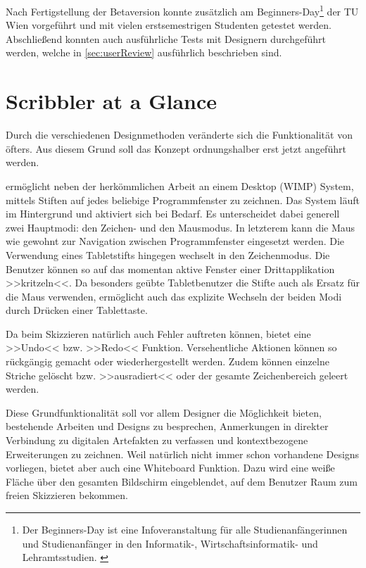 \medskip Nach Fertigstellung der Betaversion konnte \scribbler zusätzlich am Beginners-Day\footnote{Der Beginners-Day ist eine Infoveranstaltung für alle Studienanfängerinnen und Studienanfänger in den Informatik-, Wirtschaftsinformatik- und Lehramtsstudien. \citep{TU:2010}} der TU Wien vorgeführt und mit vielen erstsemestrigen Studenten getestet werden. Abschließend konnten auch ausführliche Tests mit Designern durchgeführt werden, welche in \autoref{sec:userReview} ausführlich beschrieben sind.

\section{Scribbler at a Glance} 
Durch die verschiedenen Designmethoden veränderte sich die Funktionalität von \scribbler öfters. Aus diesem Grund soll das Konzept ordnungshalber erst jetzt angeführt werden.

\medskip \scribbler ermöglicht neben der herkömmlichen Arbeit an einem Desktop (\acs{WIMP}) System, mittels Stiften auf jedes beliebige Programmfenster zu zeichnen. Das System läuft im Hintergrund und aktiviert sich bei Bedarf. Es unterscheidet dabei generell zwei Hauptmodi: den Zeichen- und den Mausmodus. In letzterem kann die Maus wie gewohnt zur Navigation zwischen Programmfenster eingesetzt werden. Die Verwendung eines Tabletstifts hingegen wechselt in den Zeichenmodus. Die Benutzer können so auf das momentan aktive Fenster einer Drittapplikation >>kritzeln<<. Da besonders geübte Tabletbenutzer die Stifte auch als Ersatz für die Maus verwenden, ermöglicht \scribbler auch das explizite Wechseln der beiden Modi durch Drücken einer Tablettaste.

\medskip Da beim Skizzieren natürlich auch Fehler auftreten können, bietet \scribbler eine >>Undo<< bzw. >>Redo<< Funktion. Versehentliche Aktionen können so rückgängig gemacht oder wiederhergestellt werden. Zudem können einzelne Striche gelöscht bzw. >>ausradiert<< oder der gesamte Zeichenbereich geleert werden.

\medskip Diese Grundfunktionalität soll vor allem Designer die Möglichkeit bieten, bestehende Arbeiten und Designs zu besprechen, Anmerkungen in direkter Verbindung zu digitalen Artefakten zu verfassen und kontextbezogene Erweiterungen zu zeichnen. Weil natürlich nicht immer schon vorhandene Designs vorliegen, bietet \scribbler aber auch eine Whiteboard Funktion. Dazu wird eine weiße Fläche über den gesamten Bildschirm eingeblendet, auf dem Benutzer Raum zum freien Skizzieren bekommen.


